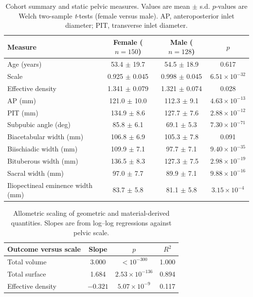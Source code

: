 \documentclass[11pt,a4paper]{article}
\begin{document}
\begin{table}[t]
\centering
\caption{Cohort summary and static pelvic measures. Values are mean $\pm$ s.d. $p$-values are Welch two-sample \emph{t}-tests (female versus male). AP, anteroposterior inlet diameter; PIT, transverse inlet diameter.}
\label{tab:cohort}
\begin{tabular}{lccc}
\toprule
Measure & Female ($n=150$) & Male ($n=128$) & $p$ \\
\midrule
Age (years) & 53.4 $\pm$ 19.7 & 54.5 $\pm$ 18.9 & 0.617 \\
Scale & 0.925 $\pm$ 0.045 & 0.998 $\pm$ 0.045 & $6.51 \times 10^{-32}$ \\
Effective density & 1.341 $\pm$ 0.079 & 1.321 $\pm$ 0.074 & 0.028 \\
AP (mm) & 121.0 $\pm$ 10.0 & 112.3 $\pm$ 9.1 & $4.63 \times 10^{-13}$ \\
PIT (mm) & 134.9 $\pm$ 8.6 & 127.7 $\pm$ 7.6 & $2.88 \times 10^{-12}$ \\
Subpubic angle (deg) & 85.8 $\pm$ 6.1 & 69.1 $\pm$ 5.3 & $7.30 \times 10^{-71}$ \\
Biacetabular width (mm) & 106.8 $\pm$ 6.9 & 105.3 $\pm$ 7.8 & 0.091 \\
Biischiadic width (mm) & 109.9 $\pm$ 7.1 & 97.7 $\pm$ 7.1 & $9.40 \times 10^{-35}$ \\
Bituberous width (mm) & 136.5 $\pm$ 8.3 & 127.3 $\pm$ 7.5 & $2.98 \times 10^{-19}$ \\
Sacral width (mm) & 97.0 $\pm$ 7.7 & 89.9 $\pm$ 7.1 & $9.88 \times 10^{-16}$ \\
Iliopectineal eminence width (mm) & 83.7 $\pm$ 5.8 & 81.1 $\pm$ 5.8 & $3.15 \times 10^{-4}$ \\
\bottomrule
\end{tabular}
\end{table}

\begin{table}[t]
\centering
\caption{Allometric scaling of geometric and material-derived quantities. Slopes are from log--log regressions against pelvic scale.}
\label{tab:allometry}
\begin{tabular}{lccc}
\toprule
Outcome versus scale & Slope & $p$ & $R^2$ \\
\midrule
Total volume & 3.000 & $< 10^{-300}$ & 1.000 \\
Total surface & 1.684 & $2.53 \times 10^{-136}$ & 0.894 \\
Effective density & $-0.321$ & $5.07 \times 10^{-9}$ & 0.117 \\
\bottomrule
\end{tabular}
\end{table}
\end{document}
